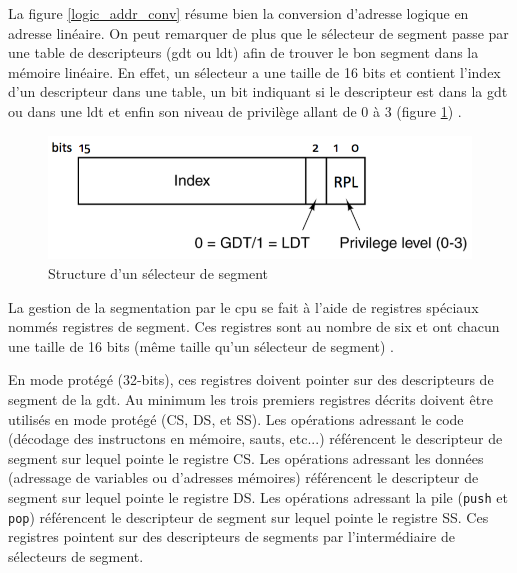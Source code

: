 La figure \ref{logic_addr_conv} résume bien la conversion d'adresse logique en
adresse linéaire. On peut remarquer de plus que le sélecteur de segment passe
par une table de descripteurs (\acrshort{gdt} ou \acrshort{ldt}) afin de trouver
le bon segment dans la mémoire linéaire. En effet, un sélecteur a une taille de
16 bits et contient l'index d'un descripteur dans une table, un bit indiquant si
le descripteur est dans la \acrshort{gdt} ou dans une \acrshort{ldt} et enfin son
niveau de privilège allant de 0 à 3 (figure \ref{seg_sel}) \cite{ref42}.

\begin{figure}[!h]
  \centering
  \includegraphics[scale=0.6]{images/seg_sel.png}
  \caption{Structure d'un sélecteur de segment}
  \label{seg_sel}
\end{figure}

La gestion de la segmentation par le \acrshort{cpu} se fait à l'aide de registres
spéciaux nommés registres de segment. Ces registres sont au nombre de six et ont
chacun une taille de 16 bits (même taille qu'un sélecteur de segment) \cite{ref42,ref18}.

\begin{center}
    \label{table_seg_reg}
\end{center}

En mode protégé (32-bits), ces registres doivent pointer sur des descripteurs
de segment de la \acrshort{gdt}. Au minimum les trois premiers registres décrits
doivent être utilisés en mode protégé (CS, DS, et SS). Les opérations adressant
le code (décodage des instructons en mémoire, sauts, etc...) référencent le descripteur
de segment sur lequel pointe le registre CS. Les opérations adressant les données
(adressage de variables ou d'adresses mémoires) référencent le descripteur de segment
sur lequel pointe le registre DS. Les opérations adressant la pile (\texttt{push}
et \texttt{pop}) référencent le descripteur de segment sur lequel pointe
le registre SS. Ces registres pointent sur des descripteurs de segments par l'intermédiaire
de sélecteurs de segment. \\

